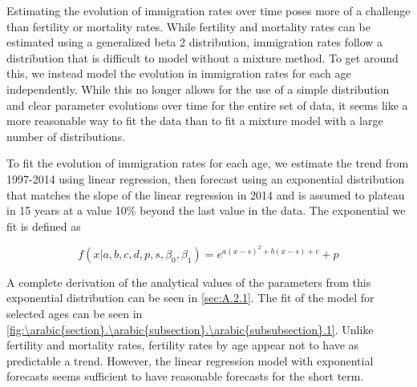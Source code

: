 \documentclass[10pt]{article}
\renewcommand{\thesection}{\arabic{section}}
\renewcommand{\thesubsection}{\thesection.\arabic{subsection}}
\renewcommand{\thesubsubsection}{\thesubsection.\arabic{subsubsection}}
\numberwithin{equation}{subsection}
\begin{document}
\par Estimating the evolution of immigration rates over time poses more of a challenge than fertility or mortality rates. While fertility and mortality rates can be estimated using a generalized beta 2 distribution, immigration rates follow a distribution that is difficult to model without a mixture method. To get around this, we instead model the evolution in immigration rates for each age independently. While this no longer allows for the use of a simple distribution and clear parameter evolutions over time for the entire set of data, it seems like a more reasonable way to fit the data than to fit a mixture model with a large number of distributions.

\par To fit the evolution of immigration rates for each age, we estimate the trend from 1997-2014 using linear regression, then forecast using an exponential distribution that matches the slope of the linear regression in 2014 and is assumed to plateau in 15 years at a value 10\% beyond the last value in the data. The exponential we fit is defined as

\begin{equation}
   f(x|a, b, c, d, p, s, \beta_0, \beta_1) = e^{a(x-s)^2 + b(x-s) + c} + p \label{eq:imm_exponential}
\end{equation}

\par A complete derivation of the analytical values of the parameters from this exponential distribution can be seen in \autoref{sec:A.2.1}. The fit of the model for selected ages can be seen in \autoref{fig:\thesubsubsection.1}. Unlike fertility and mortality rates, fertility rates by age appear not to have as predictable a trend. However, the linear regression model with exponential forecasts seems sufficient to have reasonable forecasts for the short term.
\end{document}
